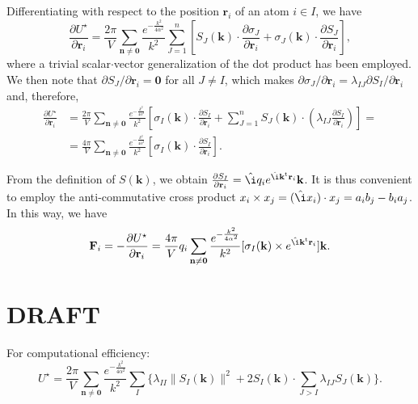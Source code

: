 \documentclass[11pt]{article}
\newcommand{\vt}[1]{\boldsymbol{\mathbf{#1}}}           %
\newcommand{\tr}[1]{#1^\text{t}}                        %
\newcommand{\im}{\hat{\i}}                              %
\begin{document}
Differentiating with respect to the position $\vt r_i$ of an atom $i \in I$, we have
\begin{equation*}
\frac{\partial U^\star}{\partial \vt r_i} = \frac{2\pi}{V}\sum_{\vt n \neq \vt 0} \frac{e^{-\frac{k^2}{4\alpha^2}}}{k^2} \sum_{J=1}^n \left[ S_J(\vt k) \cdot \frac{\partial \sigma_J}{\partial \vt r_i} + \sigma_J(\vt k) \cdot \frac{\partial S_J}{\partial \vt r_i}\right],
\end{equation*}
where a trivial scalar$\cdot$vector generalization of the dot product has been employed. We then note that $\partial S_J / \partial \vt r_i = \vt 0$ for all $J \neq I$, which makes $\partial \sigma_J / \partial \vt r_i = \lambda_{IJ} {\partial S_I}/{\partial \vt r_i}$ and, therefore,
\begin{align*}
\frac{\partial U^\star}{\partial \vt r_i} &= \frac{2\pi}{V}\sum_{\vt n \neq \vt 0} \frac{e^{-\frac{k^2}{4\alpha^2}}}{k^2} \left[ \sigma_I(\vt k) \cdot \frac{\partial S_I}{\partial \vt r_i} + \sum_{J=1}^n S_J(\vt k) \cdot \left( \lambda_{IJ} \frac{\partial S_I}{\partial \vt r_i} \right) \right] = \\
&= \frac{4\pi}{V}\sum_{\vt n \neq \vt 0} \frac{e^{-\frac{k^2}{4\alpha^2}}}{k^2} \left[ \sigma_I(\vt k) \cdot \frac{\partial S_I}{\partial \vt r_i} \right].
\end{align*}

From the definition of $S(\vt k)$, we obtain $\frac{\partial S_I}{\partial \vt r_i} = \im q_i e^{\im \tr{\vt k}{\vt r}_i} \vt k$. It is thus convenient to employ the anti-commutative cross product $x_i \times x_j = (\im x_i) \cdot x_j = a_ib_j- b_ia_j$. In this way, we have
\begin{equation*}
{\vt F}_i = -\frac{\partial U^\star}{\partial \vt r_i} = \frac{4\pi}{V} q_i \sum_{\vt n \neq \vt 0} \frac{e^{-\frac{k^2}{4\alpha^2}}}{k^2} [ \sigma_I(\vt k) \times e^{\im \tr{\vt k}{\vt r}_i} ]{\vt k}.
\end{equation*}

\section{DRAFT}

For computational efficiency:
\begin{equation*}
U^\star = \frac{2\pi}{V}\sum_{\vt n \neq \vt 0} \frac{e^{-\frac{k^2}{4\alpha^2}}}{k^2} \sum_I \bigg\{\lambda_{II} \|S_I(\vt k)\|^2 + 2 S_I(\vt k) \cdot \sum_{J > I} \lambda_{IJ} S_J(\vt k)\bigg\}.
\end{equation*}
\end{document}
